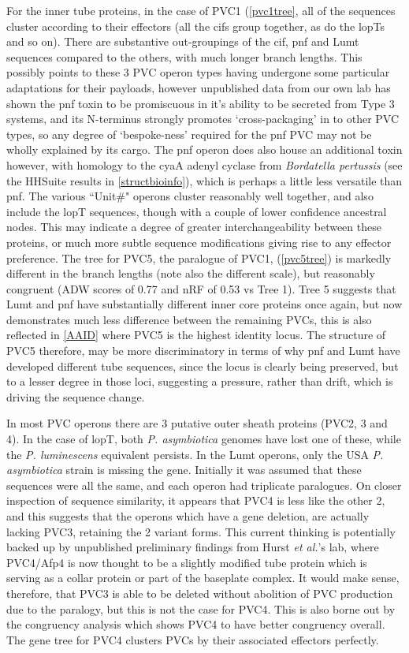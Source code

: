 For the inner tube proteins, in the case of PVC1 (\vref{pvc1tree}, all of the sequences cluster according to their effectors (all the cifs group together, as do the lopTs and so on). There are substantive out-groupings of the cif, pnf and Lumt sequences compared to the others, with much longer branch lengths. This possibly points to these 3 PVC operon types having undergone some particular adaptations for their payloads, however unpublished data from our own lab has shown the pnf toxin to be promiscuous in it's ability to be secreted from Type 3 systems, and its N-terminus strongly promotes `cross-packaging' in to other PVC types, so any degree of `bespoke-ness' required for the pnf PVC may not be wholly explained by its cargo. The pnf operon does also house an additional toxin however, with homology to the cyaA adenyl cyclase from \emph{Bordatella pertussis} (see the HHSuite results in \vref{structbioinfo}), which is perhaps a little less versatile than pnf. The various ``Unit\#" operons cluster reasonably well together, and also include the lopT sequences, though with a couple of lower confidence ancestral nodes. This may indicate a degree of greater interchangeability between these proteins, or much more subtle sequence modifications giving rise to any effector preference. The tree for PVC5, the paralogue of PVC1, (\vref{pvc5tree}) is markedly different in the branch lengths (note also the different scale), but reasonably congruent (ADW scores of 0.77 and nRF of 0.53 vs Tree 1). Tree 5 suggests that Lumt and pnf have substantially different inner core proteins once again, but now demonstrates much less difference between the remaining PVCs, this is also reflected in \vref{AAID} where PVC5 is the highest identity locus. The structure of PVC5 therefore, may be more discriminatory in terms of why pnf and Lumt have developed different tube sequences, since the locus is clearly being preserved, but to a lesser degree in those loci, suggesting a pressure, rather than drift, which is driving the sequence change.

In most PVC operons there are 3 putative outer sheath proteins (PVC2, 3 and 4). In the case of lopT, both \emph{P. asymbiotica} genomes have lost one of these, while the \emph{P. luminescens} equivalent persists. In the Lumt operons, only the USA \emph{P. asymbiotica} strain is missing the gene. Initially it was assumed that these sequences were all the same, and each operon had triplicate paralogues. On closer inspection of sequence similarity, it appears that PVC4 is less like the other 2, and this suggests that the operons which have a gene deletion, are actually lacking PVC3, retaining the 2 variant forms. This current thinking is potentially backed up by unpublished preliminary findings from Hurst \emph{et al.}'s lab, where PVC4/Afp4 is now thought to be a slightly modified tube protein which is serving as a collar protein or part of the baseplate complex. It would make sense, therefore, that PVC3 is able to be deleted without abolition of PVC production due to the paralogy, but this is not the case for PVC4. This is also borne out by the congruency analysis which shows PVC4 to have better congruency overall. The gene tree for PVC4 clusters PVCs by their associated effectors perfectly.

